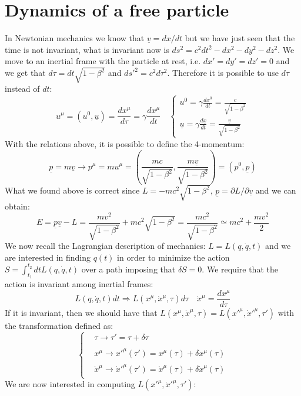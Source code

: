 \documentclass[../main.tex]{subfiles}
\begin{document}
\section{Dynamics of a free particle}
In Newtonian mechanics we know that $\underline{v}=dx/dt$ but we have just seen that the time is not invariant, what is invariant now is $ds^2=c^2dt^2-dx^2-dy^2-dz^2$. We move to an inertial frame with the particle at rest, i.e. $dx'=dy'=dz'=0$ and we get that $d\tau=dt\sqrt{1-\beta^2}$ and $ds'^2=c^2d\tau^2$. Therefore it is possible to use $d\tau$ instead of $dt$:
\[
u^{\mu}=(u^0,\underline{u})=\frac{dx^{\mu}}{d\tau}=\gamma\frac{dx^{\mu}}{dt} \quad \left\{\begin{aligned}
u^0=\gamma\frac{dx^0}{dt}=\frac{c}{\sqrt{1-\beta^2}}\\
\underline{u}=\gamma\frac{d\underline{x}}{dt}=\frac{\underline{v}}{\sqrt{1-\beta^2}}
\end{aligned}\right.
\]
With the relations above, it is possible to define the 4-momentum: 
\[
\underline{p}=m\underline{v}\xrightarrow[]{}p^{\mu}=mu^{\mu}=\left(\frac{mc}{\sqrt{1-\beta^2}},\frac{m\underline{v}}{\sqrt{1-\beta^2}}\right)=(p^0,\underline{p})
\]
What we found above is correct since $L=-mc^2\sqrt{1-\beta^2}$, $\underline{p}=\partial L/\partial \underline{v}$ and we can obtain:
\[
E=\underline{p}\underline{v}-L=\frac{mv^2}{\sqrt{1-\beta^2}}+mc^2\sqrt{1-\beta^2}=\frac{mc^2}{\sqrt{1-\beta^2}}\simeq mc^2+\frac{mv^2}{2}
\]
We now recall the Lagrangian description of mechanics: $L=L(q,\Dot{q},t)$ and we are interested in finding $q(t)$ in order to minimize the action $S=\int_{t_1}^{t_2}dtL(q,\Dot{q},t)$ over a path imposing that $\delta S=0$. We require that the action is invariant among inertial frames:
\[
L(q,\Dot{q},t)dt\Rightarrow L(x^{\mu},\Dot{x}^{\mu},\tau)d\tau \quad \Dot{x}^{\mu}=\frac{dx^{\mu}}{d\tau}
\]
If it is invariant, then we should have that $L(x^{\mu},\Dot{x}^{\mu},\tau)=L(x'^{\mu},\Dot{x}'^{\mu},\tau')$ with the transformation defined as:
\[
\left\{
\begin{aligned}
&\tau\xrightarrow[]{}\tau'=\tau+\delta\tau\\
&x^{\mu}\xrightarrow[]{}x'^{\mu}(\tau')=x^{\mu}(\tau)+\delta x^{\mu}(\tau)\\
&\Dot{x}^{\mu}\xrightarrow[]{}\Dot{x}'^{\mu}(\tau')=\Dot{x}^{\mu}(\tau)+\delta\Dot{x}^{\mu}(\tau)
\end{aligned}
\right.
\]
We are now interested in computing $L(x'^{\mu},\Dot{x}'^{\mu},\tau')$:
\end{document}
